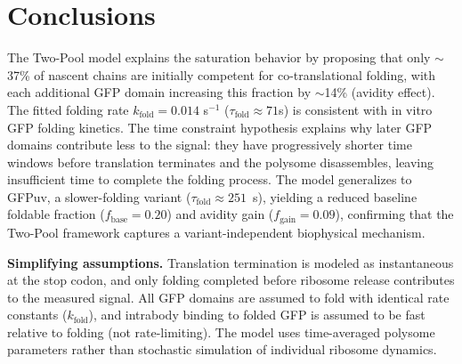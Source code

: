 \documentclass[11pt,a4paper]{article}
\newcommand{\kfold}{k_{\text{fold}}}
\newcommand{\taufold}{\tau_{\text{fold}}}
\begin{document}
\section{Conclusions}

The Two-Pool model explains the saturation behavior by proposing that only $\sim$37\% of nascent chains are initially competent for co-translational folding, with each additional GFP domain increasing this fraction by $\sim$14\% (avidity effect). The fitted folding rate $\kfold = 0.014$ s$^{-1}$ ($\taufold \approx 71$s) is consistent with in vitro GFP folding kinetics. The time constraint hypothesis explains why later GFP domains contribute less to the signal: they have progressively shorter time windows before translation terminates and the polysome disassembles, leaving insufficient time to complete the folding process. The model generalizes to GFPuv, a slower-folding variant ($\taufold \approx 251$~s), yielding a reduced baseline foldable fraction ($f_{\text{base}} = 0.20$) and avidity gain ($f_{\text{gain}} = 0.09$), confirming that the Two-Pool framework captures a variant-independent biophysical mechanism.

\textbf{Simplifying assumptions.} Translation termination is modeled as instantaneous at the stop codon, and only folding completed before ribosome release contributes to the measured signal. All GFP domains are assumed to fold with identical rate constants ($\kfold$), and intrabody binding to folded GFP is assumed to be fast relative to folding (not rate-limiting). The model uses time-averaged polysome parameters rather than stochastic simulation of individual ribosome dynamics.

\end{document}
